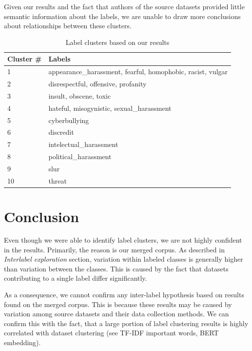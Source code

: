 \documentclass[fleqn,moreauthors,10pt]{ds_report}
\begin{document}
Given our results and the fact that authors of the source datasets provided little semantic information about the labels, we are unable to draw more conclusions about relationships between these clusters.

\begin{table}[h]
    \centering
    \begin{tabular}{ll}
        \toprule
        Cluster \# & Labels \\
        \toprule
        1 & \parbox[t]{5cm}{appearance\_harassment, fearful, homophobic, racist, vulgar} \\
        2 & disrespectful, offensive, profanity \\
        3 & insult, obscene, toxic \\
        4 & hateful, misogynistic, sexual\_harassment \\
        5 & cyberbullying \\
        6 & discredit \\
        7 & intelectual\_harassment \\
        8 & political\_harassment \\
        9 & slur \\
        10 & threat \\
        \toprule
    \end{tabular}
    \caption{Label clusters based on our results}
    \label{tab:clusters}
\end{table}

\section*{Conclusion}

Even though we were able to identify label clusters, we are not highly confident in the results. Primarily, the reason is our merged corpus. As described in \textit{Interlabel exploration} section, variation within labeled classes is generally higher than variation between the classes. This is caused by the fact that datasets contributing to a single label differ significantly.  

As a consequence, we cannot confirm any inter-label hypothesis based on results found on the merged corpus. This is because these results may be caused by variation among source datasets and their data collection methods. We can confirm this with the fact, that a large portion of label clustering results is highly correlated with dataset clustering (see TF-IDF important words, BERT embedding).
\end{document}
